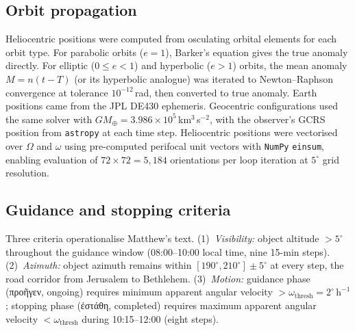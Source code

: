 \documentclass[sn-nature]{sn-jnl}
\newcommand{\grk}[1]{{\fontencoding{LGR}\selectfont #1}}
\newcommand{\grk}[1]{{\greekfont #1}}
\begin{document}
\subsection{Orbit propagation}

Heliocentric positions were computed from osculating orbital elements for
each orbit type. For parabolic orbits ($e=1$), Barker's equation gives the
true anomaly directly. For elliptic ($0\le e<1$) and hyperbolic ($e>1$)
orbits, the mean anomaly $M = n(t-T)$ (or its hyperbolic analogue) was
iterated to Newton--Raphson convergence at tolerance $10^{-12}$\,rad, then
converted to true anomaly. Earth positions came from the JPL DE430
ephemeris\cite{folkner2014}. Geocentric configurations used the same solver
with $GM_\oplus = 3.986\times10^5$\,km$^3$\,s$^{-2}$, with the observer's
GCRS position from \texttt{astropy} at each time step. Heliocentric
positions were vectorised over $\Omega$ and $\omega$ using pre-computed
perifocal unit vectors with \texttt{NumPy}\cite{harris2020}
\texttt{einsum}, enabling evaluation of $72\times72=5{,}184$ orientations
per loop iteration at $5^\circ$ grid resolution.

\subsection{Guidance and stopping criteria}

Three criteria operationalise Matthew's text. (1)~\textit{Visibility:}
object altitude $>5^\circ$ throughout the guidance window
(08:00--10:00 local time, nine 15-min steps). (2)~\textit{Azimuth:}
object azimuth remains within $[190^\circ, 210^\circ]\pm5^\circ$ at every
step, the road corridor from Jerusalem to Bethlehem. (3)~\textit{Motion:}
guidance phase (\grk{προῆγεν}, ongoing) requires minimum apparent angular
velocity $>\omega_\text{thresh}=2^\circ\,\mathrm{h}^{-1}$; stopping phase
(\grk{ἐστάθη}, completed) requires maximum apparent angular velocity
$<\omega_\text{thresh}$ during 10:15--12:00 (eight steps).
\end{document}
